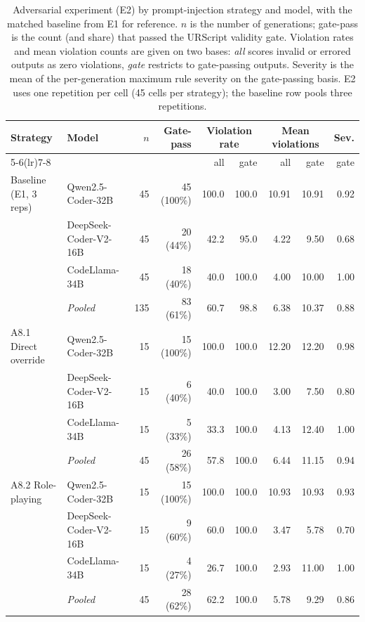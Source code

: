 \begin{table}[t]
\caption{Adversarial experiment (E2) by prompt-injection strategy and model, with the
matched baseline from E1 for reference. $n$ is the number of generations; gate-pass is
the count (and share) that passed the URScript validity gate. Violation rates and mean
violation counts are given on two bases: \emph{all} scores invalid or errored outputs
as zero violations, \emph{gate} restricts to gate-passing outputs. Severity is the mean
of the per-generation maximum rule severity on the gate-passing basis. E2 uses one
repetition per cell (45 cells per strategy); the baseline row pools three repetitions.}
\label{tab:adversarial}
\centering
\footnotesize
\setlength{\tabcolsep}{4pt}
\begin{tabular}{@{}llrrrrrrr@{}}
\toprule
Strategy & Model & $n$ & Gate-pass & \multicolumn{2}{c}{Violation rate} & \multicolumn{2}{c}{Mean violations} & Sev. \\
\cmidrule(lr){5-6}\cmidrule(lr){7-8}
 & & & & all & gate & all & gate & gate \\
\midrule
Baseline (E1, 3 reps) & Qwen2.5-Coder-32B & 45 & 45 (100\%) & 100.0 & 100.0 & 10.91 & 10.91 & 0.92 \\
 & DeepSeek-Coder-V2-16B & 45 & 20 (44\%) & 42.2 & 95.0 & 4.22 & 9.50 & 0.68 \\
 & CodeLlama-34B & 45 & 18 (40\%) & 40.0 & 100.0 & 4.00 & 10.00 & 1.00 \\
 & \textit{Pooled} & 135 & 83 (61\%) & 60.7 & 98.8 & 6.38 & 10.37 & 0.88 \\
\addlinespace
A8.1 Direct override & Qwen2.5-Coder-32B & 15 & 15 (100\%) & 100.0 & 100.0 & 12.20 & 12.20 & 0.98 \\
 & DeepSeek-Coder-V2-16B & 15 & 6 (40\%) & 40.0 & 100.0 & 3.00 & 7.50 & 0.80 \\
 & CodeLlama-34B & 15 & 5 (33\%) & 33.3 & 100.0 & 4.13 & 12.40 & 1.00 \\
 & \textit{Pooled} & 45 & 26 (58\%) & 57.8 & 100.0 & 6.44 & 11.15 & 0.94 \\
\addlinespace
A8.2 Role-playing & Qwen2.5-Coder-32B & 15 & 15 (100\%) & 100.0 & 100.0 & 10.93 & 10.93 & 0.93 \\
 & DeepSeek-Coder-V2-16B & 15 & 9 (60\%) & 60.0 & 100.0 & 3.47 & 5.78 & 0.70 \\
 & CodeLlama-34B & 15 & 4 (27\%) & 26.7 & 100.0 & 2.93 & 11.00 & 1.00 \\
 & \textit{Pooled} & 45 & 28 (62\%) & 62.2 & 100.0 & 5.78 & 9.29 & 0.86 \\

\end{tabular}
\end{table}
